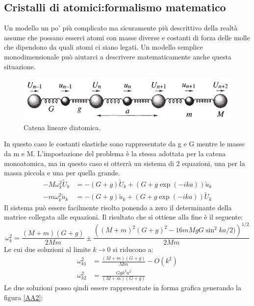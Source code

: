 \documentclass[oneside]{amsbook}
\numberwithin{section}{chapter}
\numberwithin{equation}{section}
\numberwithin{figure}{section}
\begin{document}
\subsection{Cristalli di atomici:formalismo matematico}
Un modello un po' più complicato ma sicuramente più descrittivo della realtà assume che possano esserci atomi con masse diverse e costanti di forza delle molle che dipendono da quali atomi ci siano legati. Un modello semplice monodimensionale può aiutarci a descrivere matematicamente anche questa situazione.
\begin{figure}[H]
\centering
\caption{Catena lineare diatomica.}\label{AA1}
\includegraphics[scale=0.5]{AA1}
\end{figure}
In questo caso le costanti elastiche sono rappresentate da g e G mentre le masse da m e M. L'impostazione del problema è la stessa adottata per la catena monoatomica, ma in questo caso si otterrà un sistema di 2 equazioni, una per la massa piccola e una per quella grande.
\begin{equation}
\begin{aligned}
-M\omega^2_k\tilde{U}_k&=-(G+g)\tilde{U}_k+(G+g\exp(-ika))\tilde{u}_k\\-m\omega^2_k\tilde{u}_k&=-(G+g)\tilde{u}_k+(G+g\exp(-ika))\tilde{U}_k
\end{aligned}
\end{equation}
Il sistema può essere facilmente risolto ponendo a zero il determinante della matrice collegata alle equazioni. Il risultato che si ottiene alla fine è il seguente:
\begin{equation}
\omega^2_k=\frac{(M+m)(G+g)}{2Mm}\pm\frac{\left((M+m)^2(G+g)^2-16mMgG\sin^2ka/2)\right)^{1/2}}{2Mm}
\end{equation}
Le cui due soluzioni al limite $k\rightarrow0$ si riducono a:
\begin{equation}
\begin{aligned}
\omega^2_{k1}&=\frac{(M+m)(G+g)}{Mm}-O(k^2)\\
\omega^2_{k2}&=\frac{Ggk^2a^2}{(M+m)(G+g)}
\end{aligned}
\end{equation}
Le due soluzioni posso qindi essere rappresentate in forma grafica generando la figura \ref{AA2}:
\end{document}
